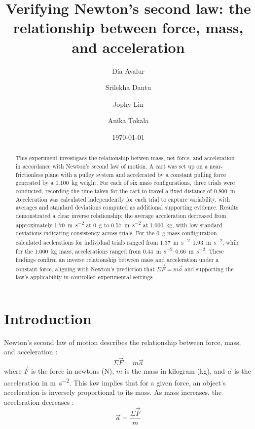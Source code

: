 ﻿\documentclass[reprint,amsmath,amssymb.aps]{revtex4-2}
\begin{document}
\title{Verifying Newton's second law: the relationship between force, mass, and acceleration}
\author{Dia Avalur}
\author{Srilekha Dantu}
\author{Jophy Lin}
\author{Anika Tokala}
\date{\today}

\begin{abstract}
This experiment investigaes the relationship betwen mass, net force, and acceleration in accordance with Newton's second law of motion. A cart was set up on a near-frictionless plane with a pulley system and accelerated by a constant pulling force generated by a \qty{0.100}{\kilo\gram} weight. For each of six mass configurations, three trials were conducted, recording the time taken for the cart to travel a fixed distance of \qty{0.800}{\meter}. Acceleration was calculated independently for each trial to capture variability, with averages and standard deviations computed as additional supporting evidence. Results demonstrated a clear inverse relationship: the average acceleration decreased from approximately \qty{1.70}{\meter\per\second\squared} at \qty{0}{\gram} to \qty{0.57}{\meter\per\second\squared} at \qty{1.000}{\kilo\gram}, with low standard deviations indicating consistency across trials. For the \qty{0}{\gram} mass confiiguration, calculated acclerations for individual trials ranged from \qtyrange{1.37}{1.93}{\meter\per\second\squared}, while for the \qty{1.000}{\kilo\gram} mass, accelerations ranged from \qtyrange{0.44}{0.66}{\meter\per\second\squared}. These findings confirm an inverse relationship between mass and acceleration under a constant force, aligning with Newton's prediction that $\Sigma \vec{F} = m\vec{a}$ and supporting the law's applicability in controlled experimental settings.
\end{abstract}


\maketitle





\section{Introduction}
Newton’s second law of motion describes the relationship between force, mass, and acceleration \cite{knight2017physics}: 
\begin{equation}
\Sigma \vec{F} = m \vec{a}
\label{eq:n2l}
\end{equation}
where $\vec{F}$ is the force in newtons (\unit{\newton}), $m$ is the mass in kilogram (\unit{\kilo\gram}), and $\vec{a}$ is the acceleration in \unit{\meter\per\second\squared}. This law implies that for a given force, an object’s acceleration is inversely proportional to its mass. As mass increases, the acceleration decreases \cite{knight2017physics}:   
\begin{equation}
\vec{a} = \dfrac{\Sigma \vec{F}}{m}
\label{eq:n2lb}
\end{equation}
\end{document}
